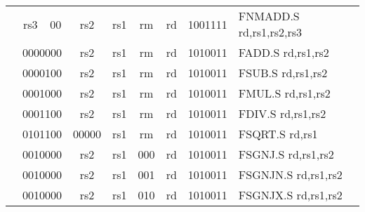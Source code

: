 \begin{table}[p]
\begin{small}
\begin{center}
\begin{tabular}{p{0in}p{0.4in}p{0.05in}p{0.05in}p{0.05in}p{0.05in}p{0.4in}p{0.6in}p{0.4in}p{0.6in}p{0.7in}l}
&
\multicolumn{2}{|c|}{rs3} &
\multicolumn{2}{c|}{00} &
\multicolumn{2}{c|}{rs2} &
\multicolumn{1}{c|}{rs1} &
\multicolumn{1}{c|}{rm} &
\multicolumn{1}{c|}{rd} &
\multicolumn{1}{c|}{1001111} & FNMADD.S rd,rs1,rs2,rs3 \\
\cline{2-11}
  

&
\multicolumn{4}{|c|}{0000000} &
\multicolumn{2}{c|}{rs2} &
\multicolumn{1}{c|}{rs1} &
\multicolumn{1}{c|}{rm} &
\multicolumn{1}{c|}{rd} &
\multicolumn{1}{c|}{1010011} & FADD.S rd,rs1,rs2 \\
\cline{2-11}
  

&
\multicolumn{4}{|c|}{0000100} &
\multicolumn{2}{c|}{rs2} &
\multicolumn{1}{c|}{rs1} &
\multicolumn{1}{c|}{rm} &
\multicolumn{1}{c|}{rd} &
\multicolumn{1}{c|}{1010011} & FSUB.S rd,rs1,rs2 \\
\cline{2-11}
  

&
\multicolumn{4}{|c|}{0001000} &
\multicolumn{2}{c|}{rs2} &
\multicolumn{1}{c|}{rs1} &
\multicolumn{1}{c|}{rm} &
\multicolumn{1}{c|}{rd} &
\multicolumn{1}{c|}{1010011} & FMUL.S rd,rs1,rs2 \\
\cline{2-11}
  

&
\multicolumn{4}{|c|}{0001100} &
\multicolumn{2}{c|}{rs2} &
\multicolumn{1}{c|}{rs1} &
\multicolumn{1}{c|}{rm} &
\multicolumn{1}{c|}{rd} &
\multicolumn{1}{c|}{1010011} & FDIV.S rd,rs1,rs2 \\
\cline{2-11}
  

&
\multicolumn{4}{|c|}{0101100} &
\multicolumn{2}{c|}{00000} &
\multicolumn{1}{c|}{rs1} &
\multicolumn{1}{c|}{rm} &
\multicolumn{1}{c|}{rd} &
\multicolumn{1}{c|}{1010011} & FSQRT.S rd,rs1 \\
\cline{2-11}
  

&
\multicolumn{4}{|c|}{0010000} &
\multicolumn{2}{c|}{rs2} &
\multicolumn{1}{c|}{rs1} &
\multicolumn{1}{c|}{000} &
\multicolumn{1}{c|}{rd} &
\multicolumn{1}{c|}{1010011} & FSGNJ.S rd,rs1,rs2 \\
\cline{2-11}
  

&
\multicolumn{4}{|c|}{0010000} &
\multicolumn{2}{c|}{rs2} &
\multicolumn{1}{c|}{rs1} &
\multicolumn{1}{c|}{001} &
\multicolumn{1}{c|}{rd} &
\multicolumn{1}{c|}{1010011} & FSGNJN.S rd,rs1,rs2 \\
\cline{2-11}
  

&
\multicolumn{4}{|c|}{0010000} &
\multicolumn{2}{c|}{rs2} &
\multicolumn{1}{c|}{rs1} &
\multicolumn{1}{c|}{010} &
\multicolumn{1}{c|}{rd} &
\multicolumn{1}{c|}{1010011} & FSGNJX.S rd,rs1,rs2 \\
\cline{2-11}
  


\end{tabular}
\end{center}
\end{small}
\end{table}
